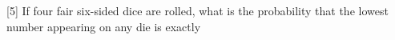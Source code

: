 [5] If four fair six-sided dice are rolled, what is the probability that the lowest number appearing on any die is exactly 
